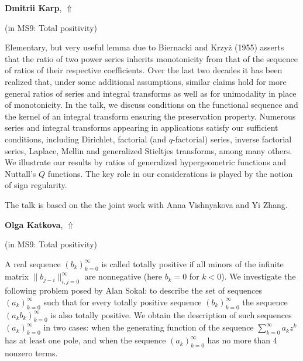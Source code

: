 \documentclass[ILAS2025-program.tex]{subfiles}
\begin{document}
\hypertarget{down0044}{}\begin{ilasabstract}
    
\textbf{Dmitrii Karp},  \hfill \hyperlink{up0044}{$\Uparrow$}
    
    
(in {\color{mstitle}MS9: Total positivity})
        
\mtskip
    Elementary, but very useful lemma due to Biernacki and Krzy\.{z} (1955) asserts that the ratio of two power series inherits monotonicity from that of the sequence of ratios of their respective  coefficients. Over the last two decades it has been realized that, under some additional assumptions, similar claims hold for more general ratios of series and integral
transforms as well as for unimodality in place of monotonicity. In the talk, we discuss conditions on the functional sequence and the kernel of an integral transform ensuring the preservation property. Numerous series and integral transforms appearing in applications satisfy our sufficient conditions, including Dirichlet, factorial (and $q$-factorial) series, inverse factorial series, Laplace, Mellin and generalized Stieltjes transforms, among many others.  We illustrate our results by ratios of generalized hypergeometric functions and Nuttall's $Q$ functions.  The key role in our considerations is played by the notion of sign regularity.

The talk is based on the the joint work with Anna Vishnyakova and Yi Zhang. 

\end{ilasabstract}
    

\hypertarget{down0121}{}\begin{ilasabstract}
    
\textbf{Olga Katkova},  \hfill \hyperlink{up0121}{$\Uparrow$}
    
    
(in {\color{mstitle}MS9: Total positivity})
        
\mtskip
    A real sequence $(b_k)_{k=0}^\infty$ is called totally positive if all minors of the infinite matrix $\| b_{j-i} \|_{i,j=0}^\infty$ are
nonnegative (here $b_k = 0$ for $k<0$). We investigate the following problem posed by Alan Sokal: to describe the set of sequences $(a_k)_{k=0}^\infty$ such that for every totally positive sequence $(b_k)_{k=0}^\infty$ the sequence $(a_k b_k)_{k=0}^\infty$ is also totally positive. We obtain the description of such sequences $(a_k)_{k=0}^\infty$ in two cases: when the generating function of the sequence $\sum_{k=0}^\infty a_k z^k$ has at least one pole, and when the sequence $(a_k)_{k=0}^\infty$ has no more than 4 nonzero terms.
\end{ilasabstract}
    
\end{document}
